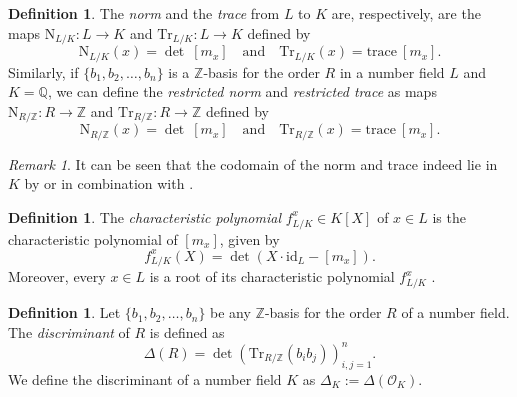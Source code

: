 \documentclass[openany, a4paper, 10pt]{book}
\theoremstyle{plain}
\theoremstyle{plain}
\theoremstyle{plain}
\theoremstyle{definition}
\newtheorem{definition}[theorem]{Definition}
\theoremstyle{plain}
\theoremstyle{definition}
\theoremstyle{remark}
\newtheorem*{remark}{Remark}
\begin{document}
\begin{definition}\label{norm_and_trace_def}
    The \textit{norm} and the \textit{trace} from $L$ to $K$ are, respectively, are the maps $\mathrm{N}_{L/K}: L \to K$ and $\mathrm{Tr}_{L/K}: L \to K$ defined by
    $$\mathrm{N}_{L/K}(x) = \det\ [m_x] \quad \textrm{and} \quad \mathrm{Tr}_{L/K}(x) = \textrm{trace}\ [m_x].$$
    Similarly, if $\{ b_1, b_2, \dots, b_n\}$ is a $\mathbb Z$-basis for the order $R$ in a number field $L$ and $K = \mathbb Q$, we can define the \textit{restricted norm} and \textit{restricted trace} as maps $\mathrm{N}_{R/\mathbb Z}: R \to \mathbb Z$ and $\mathrm{Tr}_{R/\mathbb Z}: R \to \mathbb Z$ defined by
    $$\mathrm{N}_{R/\mathbb Z}(x) = \det\ [m_x] \quad \textrm{and} \quad \mathrm{Tr}_{R/\mathbb Z}(x) = \textrm{trace}\ [m_x].$$
\end{definition}
\begin{remark}
    It can be seen that the codomain of the norm and trace indeed lie in $K$ by \cite{basis_independent} or \cite[Proposition~2.8]{lie_in_K} in combination with \cite[Proposition~2.3]{lie_in_K}.
\end{remark}
\begin{definition}
    The \textit{characteristic polynomial} $f_{L/K}^x \in K[X]$ of $x \in L$ is the characteristic polynomial of $[m_x]$, given by
    $$f_{L/K}^x(X) = \det(X\cdot \mathrm{id}_L - [m_x]).$$
    Moreover, every $x \in L$ is a root of its characteristic polynomial $f^x_{L/K}$ \cite[Theorem~5.6]{Conrad_trace_norm}.
\end{definition}
\begin{definition}
    Let $\{b_1, b_2, \dots, b_n\}$ be any $\mathbb Z$-basis for the order $R$ of a number field.
    The \textit{discriminant} of $R$ is defined as
    $$\Delta(R) = \det(\mathrm{Tr}_{R/\mathbb Z} (b_i b_j))^n_{i,j=1}.$$
    We define the discriminant of a number field $K$ as $\Delta_K := \Delta(\mathcal O_K)$.
\end{definition}
\end{document}
